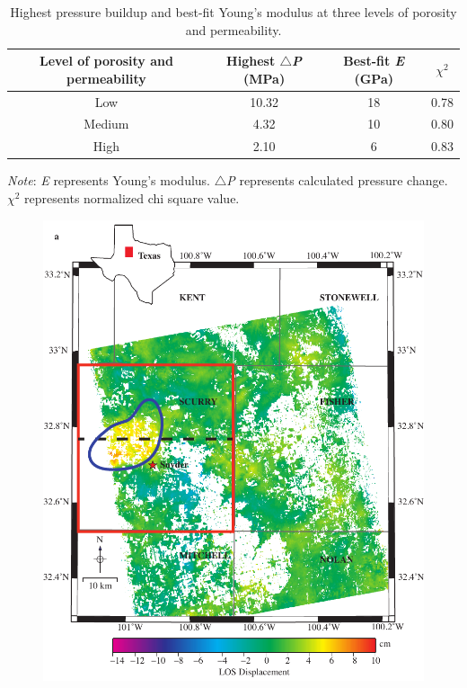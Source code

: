 \clearpage
\begin{table}[h!]
	\begin{center}
		\begin{threeparttable}
		\caption{Highest pressure buildup and best-fit Young's modulus at three levels of porosity and permeability.}
		\label{tab:table3}
		\begin{tabular}{cccc}
			\midrule
			Level of porosity and permeability & Highest $\triangle$\textit{P} (MPa) & Best-fit \textit{E} (GPa) & $\chi$$^{2}$\\
			\midrule
			Low & 10.32 & 18 & 0.78\\
			Medium & 4.32 & 10 & 0.80\\
			High & 2.10 & 6 & 0.83\\
			\midrule						
		\end{tabular}
		\begin{tablenotes}
			\small
			\item \textit{Note}: \textit{E} represents Young's modulus. $\triangle$\textit{P} represents calculated pressure change. $\chi$$^{2}$ represents normalized chi square value.
		\end{tablenotes}
		\end{threeparttable}
	\end{center}
\end{table}

\clearpage
\begin{figure}
\centering
\includegraphics{figs_paper3/Fig1a.pdf}
\label{fig:map_los_a}
\end{figure}


